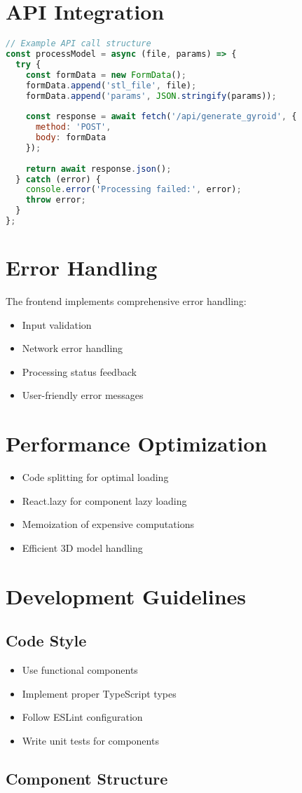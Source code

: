 \section{API Integration}
\begin{lstlisting}[language=JavaScript]
// Example API call structure
const processModel = async (file, params) => {
  try {
    const formData = new FormData();
    formData.append('stl_file', file);
    formData.append('params', JSON.stringify(params));
    
    const response = await fetch('/api/generate_gyroid', {
      method: 'POST',
      body: formData
    });
    
    return await response.json();
  } catch (error) {
    console.error('Processing failed:', error);
    throw error;
  }
};
\end{lstlisting}

\section{Error Handling}
The frontend implements comprehensive error handling:
\begin{itemize}
    \item Input validation
    \item Network error handling
    \item Processing status feedback
    \item User-friendly error messages
\end{itemize}

\section{Performance Optimization}
\begin{itemize}
    \item Code splitting for optimal loading
    \item React.lazy for component lazy loading
    \item Memoization of expensive computations
    \item Efficient 3D model handling
\end{itemize}

\section{Development Guidelines}
\subsection{Code Style}
\begin{itemize}
    \item Use functional components
    \item Implement proper TypeScript types
    \item Follow ESLint configuration
    \item Write unit tests for components
\end{itemize}

\subsection{Component Structure}
